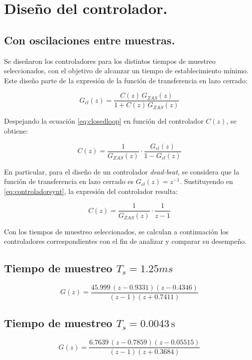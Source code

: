 \section{Diseño del controlador.}

\subsection{Con oscilaciones entre muestras.}

Se diseñaron los controladores para los distintos tiempos de muestreo seleccionados, con el objetivo de alcanzar un tiempo de establecimiento mínimo. Este diseño parte de la expresión de la función de transferencia en lazo cerrado:

\begin{equation}
	G_{cl}(z) = \frac{C(z) \, G_{ZAS}(z)}{1 + C(z) \, G_{ZAS}(z)}
	\label{eq:closedloop}
\end{equation}

Despejando la ecuación \eqref{eq:closedloop} en función del controlador $C(z)$, se obtiene:

\begin{equation}
	C(z) = \frac{1}{G_{ZAS}(z)} \cdot \frac{G_{cl}(z)}{1 - G_{cl}(z)}
	\label{eq:controladorsynt}
\end{equation}

En particular, para el diseño de un controlador \emph{dead-beat}, se considera que la función de transferencia en lazo cerrado es $G_{cl}(z) = z^{-1}$. Sustituyendo en \eqref{eq:controladorsynt}, la expresión del controlador resulta:

\begin{equation}
	C(z) = \frac{1}{G_{ZAS}(z)} \cdot \frac{1}{z - 1}
	\label{eq:control1}
\end{equation}

Con los tiempos de muestreo seleccionados, se calculan a continuación los controladores correspondientes con el fin de analizar y comparar su desempeño.


\subsection*{Tiempo de muestreo $T_s = 1.25ms$}
\[
G(z) = \frac{45.999  \, (z - 0.9331)(z - 0.4346)}{(z - 1)(z + 0.7411)}
\]


\subsection*{Tiempo de muestreo $T_s = 0.0043 \, \text{s}$}
\[
G(z) = \frac{6.7639 \, (z - 0.7859)(z - 0.05515)}{(z - 1)(z + 0.3684)}
\]
